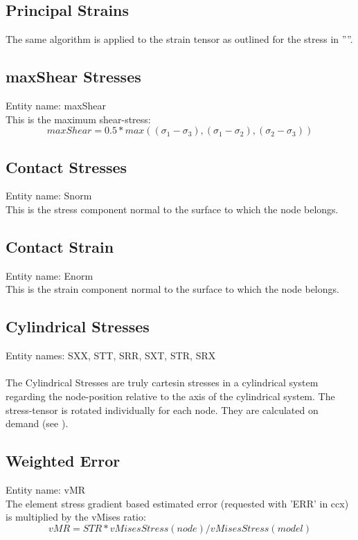 \documentclass{article}
\begin{document}
\subsection{\label{Principal Strains}Principal Strains}
The same algorithm is applied to the strain tensor as outlined for the stress in ''''.

\subsection{\label{maxShear Stress}maxShear Stresses}
Entity name: maxShear\\
This is the maximum shear-stress:
\[ maxShear = 0.5 * max( (\sigma_{1} - \sigma_{3}),(\sigma_{1} - \sigma_{2}),(\sigma_{2} - \sigma_{3}) )\]

\subsection{\label{Contact Stress}Contact Stresses}
Entity name: Snorm\\
This is the stress component normal to the surface to which the node belongs.

\subsection{\label{Contact Strain}Contact Strain}
Entity name: Enorm\\
This is the strain component normal to the surface to which the node belongs.

\subsection{\label{Cylindrical Stresses}Cylindrical Stresses}
Entity names: SXX, STT, SRR, SXT, STR, SRX\\\\
The Cylindrical Stresses are truly cartesin stresses in a cylindrical system regarding the node-position relative to the axis of the cylindrical system. The stress-tensor is rotated individually for each node. They are calculated on demand (see ).

\subsection{\label{Weighted Error}Weighted Error}
Entity name: vMR\\
The element stress gradient based estimated error (requested with 'ERR' in
ccx) is multiplied by the vMises ratio:
\[ vMR = STR * vMisesStress(node) / vMisesStress(model)\]
\end{document}
